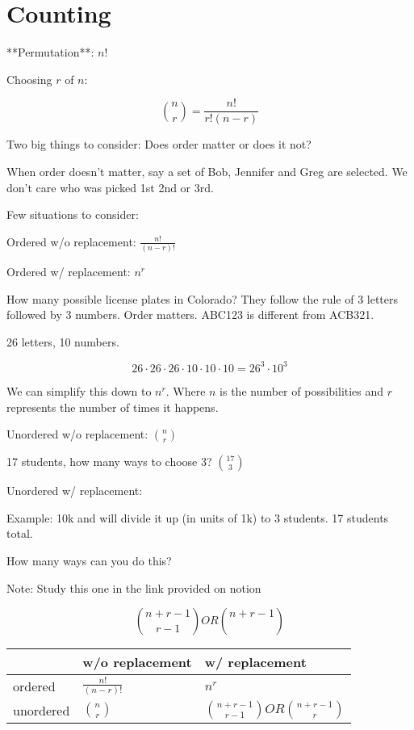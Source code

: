 \documentclass[a4paper]{article}
\begin{document}
\section*{Counting}

**Permutation**: $n!$

Choosing $r$ of $n$:

$$
{n \choose r} = \frac{n!}{r!(n-r)}
$$

Two big things to consider: Does order matter or does it not?

When order doesn't matter, say a set of Bob, Jennifer and Greg are selected. We don't care who was picked 1st 2nd or 3rd.

Few situations to consider:

Ordered w/o replacement: $\frac{n!}{(n-r)!}$

Ordered w/ replacement: $n^r$

How many possible license plates in Colorado? They follow the rule of 3 letters followed by 3 numbers. Order matters. ABC123 is different from ACB321.

26 letters, 10 numbers.

\[26 \cdot 26 \cdot 26 \cdot 10 \cdot 10 \cdot 10 = 26^3 \cdot 10^3\]

We can simplify this down to $n^r$. Where $n$ is the number of possibilities and $r$ represents the number of times it happens.

Unordered w/o replacement: $n \choose r$

17 students, how many ways to choose 3? $17 \choose 3$

Unordered w/ replacement:

Example: 10k and will divide it up (in units of 1k) to 3 students. 17 students total.

How many ways can you do this?

Note: Study this one in the link provided on notion

\[
	{n+r-1 \choose r-1} OR {n+r-1 \choose }
\]

\begin{table}[ht]
\begin{tabular}{|l|l|l|}
\hline
          & w/o replacement & \multicolumn{1}{l|}{w/ replacement} \\ \hline
ordered   & $\frac{n!}{(n-r)!}$    & $n^r$                       \\ \hline
unordered & $n \choose r$   & ${n+r-1 \choose r-1} OR {n+r-1 \choose r}$  \\ \hline
\end{tabular}
\end{table}
\end{document}
